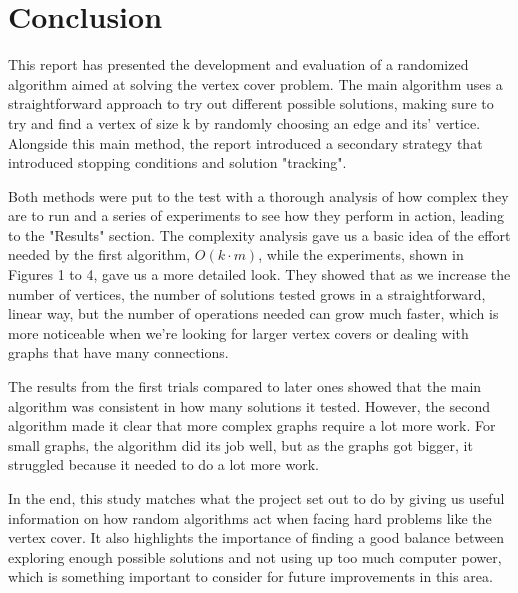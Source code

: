 \section{Conclusion}

This report has presented the development and evaluation of a randomized algorithm aimed at solving the vertex cover problem. The main algorithm uses a straightforward approach to try out different possible solutions, making sure to try and find a vertex of size k by randomly choosing an edge and its' vertice. Alongside this main method, the report introduced a secondary strategy that introduced stopping conditions and solution "tracking".

Both methods were put to the test with a thorough analysis of how complex they are to run and a series of experiments to see how they perform in action, leading to the "Results" section. The complexity analysis gave us a basic idea of the effort needed by the first algorithm, \(O(k \cdot m)\), while the experiments, shown in Figures 1 to 4, gave us a more detailed look. They showed that as we increase the number of vertices, the number of solutions tested grows in a straightforward, linear way, but the number of operations needed can grow much faster, which is more noticeable when we're looking for larger vertex covers or dealing with graphs that have many connections.

The results from the first trials compared to later ones showed that the main algorithm was consistent in how many solutions it tested. However, the second algorithm made it clear that more complex graphs require a lot more work. For small graphs, the algorithm did its job well, but as the graphs got bigger, it struggled because it needed to do a lot more work.

In the end, this study matches what the project set out to do by giving us useful information on how random algorithms act when facing hard problems like the vertex cover. It also highlights the importance of finding a good balance between exploring enough possible solutions and not using up too much computer power, which is something important to consider for future improvements in this area.